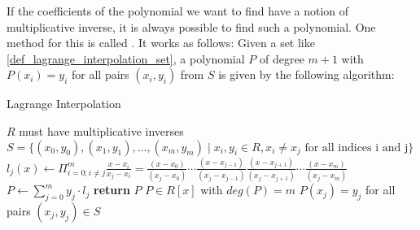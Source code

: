 If the coefficients of the polynomial we want to find have a notion of multiplicative inverse, it is always possible to find such a polynomial. One method for this is called . It works as follows:
Given a set like \ref{def_lagrange_interpolation_set}, a polynomial $P$ of degree $m+1$ with $P(x_i)=y_i$ for all pairs $(x_i,y_i)$ from $S$ is given by the following algorithm:

\begin{algorithm}\caption{Lagrange Interpolation}
\label{alg_lagrange_interplation}
\begin{algorithmic}[0]
\Require $R$ must have multiplicative inverses
\Require $S= \{(x_0,y_0), (x_1,y_1),\ldots,(x_m,y_m)\;|\; x_i,y_i\in R, x_i\neq x_j\text{ for all indices i and j}\}$  
\State  $l_j(x) \gets \Pi_{i=0;i\neq j}^{m}\frac{x-x_i}{x_j-x_i} = \frac{(x-x_0)}{(x_j-x_0)} \cdots \frac{(x-x_{j-1})}{(x_j-x_{j - 1})} \frac{(x-x_{j+1})}{(x_j-x_{j+1})} \cdots \frac{(x-x_m)}{(x_j-x_m)}$
\EndFor
\State $P\gets \sum_{j=0}^m y_j\cdot l_j$
\State \textbf{return} $P$ 
\EndProcedure
\Ensure $P\in R[x]$ with $deg(P)=m$
\Ensure $P(x_j)=y_j$ for all pairs $(x_j,y_j)\in S$
\end{algorithmic}
\end{algorithm}

